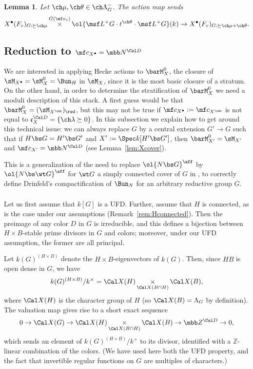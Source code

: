 \documentclass[final]{amsart}
\newtheorem{lem}[subsubsection]{Lemma}
\theoremstyle{remark}
\theoremstyle{definition}
\DeclareMathOperator*{\xt}{\times}
\numberwithin{equation}{section}
\begin{document}
\begin{lem} \label{lem:act-kpoints}
Let $\ch\mu,\ch\theta \in \ch\Lambda^-_G$. 
The action map sends 
\[
    X^\bullet(F_v)_{G:\succeq \ch\mu} \xt^{G(\mf o_v)} \ol{\msf L^+G \cdot t^{\ch\theta} \cdot \msf L^+G}(k) \to X^\bullet(F_v)_{G:\succeq \ch\mu+ \ch\theta}. 
\]
\end{lem}


\subsection{Reduction to $\mf c_{X^\bullet} = \mbb N^{\Cal D}$} \label{sect:freemonoid}
We are interested in applying Hecke actions to $\barM_X^0$, the closure of $\sM_{X^\bullet}=\sM_X^0=\Bun_H$ in $\sM_X$, since it is the most basic closure of a stratum. 
On the other hand, in order to determine the stratification of $\barM_X^0$ we
need a moduli description of this stack. A first guess would be 
that $\barM_X^0 = (\sM_{X^\can})_\red$, but this may not be true if $\mf c_{X^\bullet} := \mf c_{X^\can}$ 
is not equal to $\mathfrak c_X^{\Cal D} = \{\ch\lambda\succeq 0\}$.
In this subsection we explain how to get around this technical issue: 
we can always replace $G$ by a central extension $G'\to G$ such that if
$H\bs G = H'\bs G'$ and $X' := \Spec k[H'\bs G']$, then 
$\barM_{X'}^0 = \sM_{X'}$ and $\mf c_{X'} = \mbb N^{\Cal D}$ (see Lemma~\ref{lem:Xcover}).

\smallskip 

This is a generalization of the need to replace $\ol{N\bs G}^\aff$ by 
$\ol{N\bs \wt G}^\aff$ for $\wt G$ a simply connected cover of $G$ 
in \cite[\S 4.1]{ABB}, \cite[\S 7.2]{Sch} 
to correctly define Drinfeld's compactification of $\Bun_N$ 
for an arbitrary reductive group $G$.

\subsubsection{} 

Let us first assume that $k[G]$ is a UFD. Further, assume that $H$ is connected, as is the case under our assumptions (Remark~\ref{rem:Hconnected}).
Then the preimage of any color $D$ in $G$ is irreducible, and this defines 
a bijection between $H\times B$-stable prime divisors in $G$ and colors; moreover, under our UFD assumption, the former are all principal. 

Let $k(G)^{(H\xt B)}$ denote the $H\xt B$-eigenvectors 
of $k(G)$. 
Then, since $H B$ is open dense in $G$, we have
\[ k(G)^{(H\times B)}/k^\times = \Cal X(H) \xt_{\Cal X(B\cap H)} \Cal X(B), 
\] 
where $\Cal X(H)$ is the character group of $H$ 
(so $\Cal X(B)=\Lambda_{G}$ by definition). The valuation map gives rise to a short exact sequence
\begin{equation} \label{e:color-basis}
 0 \to \Cal X(G) \to  
    \Cal X(H) \xt_{\Cal X(B \cap H)} \Cal X(B) \to   \mbb Z^{\Cal D} \to 0,
\end{equation}
which sends an element of $k(G)^{(H\times B)}/k^\times$ to its divisor, identified with a $\mathbb Z$-linear combination of the colors. (We have used here both the UFD property, and the fact that invertible regular functions on $G$ are multiples of characters.)
\end{document}
